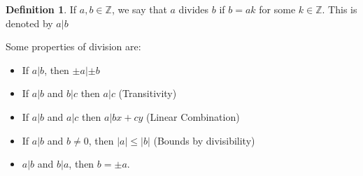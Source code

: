 \documentclass[12pt,letterpaper]{amsbook}
\theoremstyle{definition}
\newtheorem{definition}{Definition} %
\newcommand{\Z}{\mathbb{Z}}
\begin{document}
\begin{definition}
  If $a,b \in \Z$, we say that $a$ divides $b$ if $b=ak$ for some $k \in \Z$. This is denoted by $a|b$
\end{definition}

Some properties of division are:

\begin{itemize}
  \item If $a|b$, then $\pm a | \pm b$
  \item If $a|b$ and $b|c$ then $a|c$ (Transitivity)
  \item If $a|b$ and $a|c$ then $a|bx+cy$ (Linear Combination)
  \item If $a|b$ and $b \neq 0$, then $|a| \leq |b|$ (Bounds by divisibility)
  \item $a|b$ and $b|a$, then $b = \pm a$.
\end{itemize}
\end{document}
